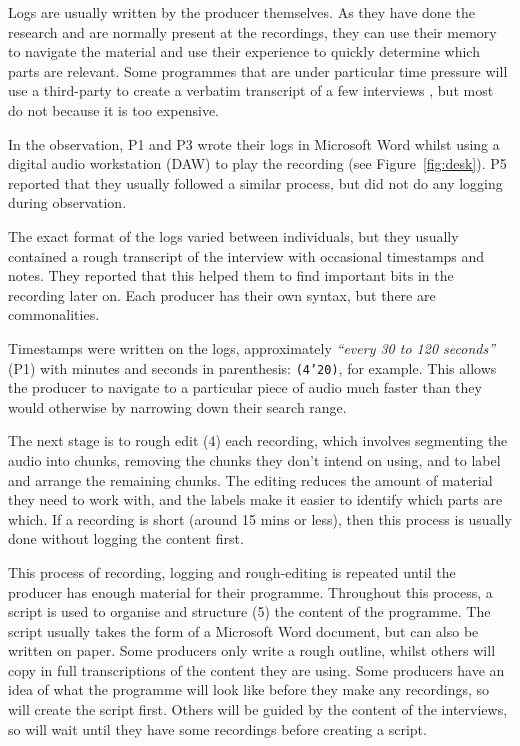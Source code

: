 Logs are usually written by the producer themselves. As they have done the research and are normally present at the
recordings, they can use their memory to navigate the material and use their experience to quickly determine which
parts are relevant. Some programmes that are under particular time pressure will use a third-party to create a verbatim
transcript of a few interviews \citep{Baume2015}, but most do not because it is too expensive.

In the observation, P1 and P3 wrote their logs in Microsoft Word whilst using a digital audio workstation (DAW) to play
the recording (see Figure~\ref{fig:desk}). P5 reported that they usually followed a similar process, but did not do any
logging during observation.

The exact format of the logs varied between individuals, but they usually contained a rough transcript of the interview
with occasional timestamps and notes. They reported that this helped them to find important bits in the recording later
on. Each producer has their own syntax, but there are commonalities.

Timestamps were written on the logs, approximately \textit{``every 30 to 120 seconds''} (P1) with minutes and seconds
in parenthesis: \texttt{(4'20)}, for example.  This allows the producer to navigate to a particular piece of audio much
faster than they would otherwise by narrowing down their search range.

The next stage is to rough edit (4) each recording, which involves segmenting the audio into chunks, removing the
chunks they don't intend on using, and to label and arrange the remaining chunks.  The editing reduces the amount of
material they need to work with, and the labels make it easier to identify which parts are which.  If a recording is
short (around 15 mins or less), then this process is usually done without logging the content first.

This process of recording, logging and rough-editing is repeated until the producer has enough material for their
programme. Throughout this process, a script is used to organise and structure (5) the content of the programme.  The
script usually takes the form of a Microsoft Word document, but can also be written on paper. Some producers only write
a rough outline, whilst others will copy in full transcriptions of the content they are using.  Some producers have an
idea of what the programme will look like before they make any recordings, so will create the script first. Others will
be guided by the content of the interviews, so will wait until they have some recordings before creating a script.

